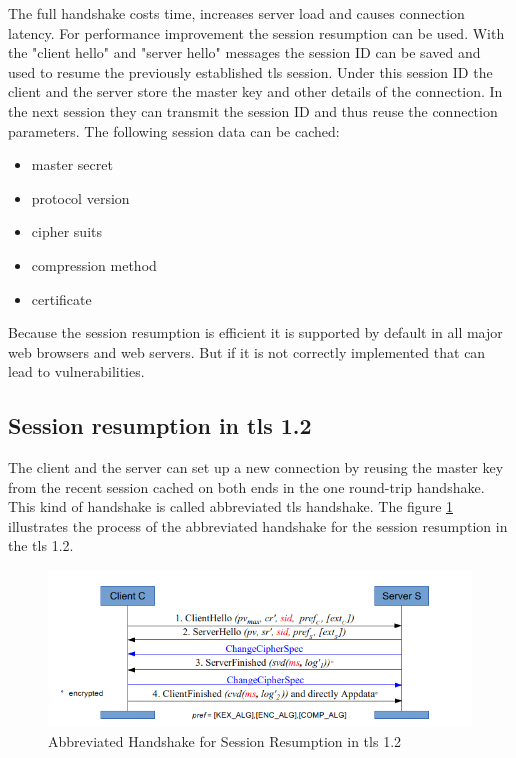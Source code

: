 The full handshake costs time, increases server load and causes connection latency. For performance improvement the session resumption can be used. With the "client hello" and "server hello" messages the session ID can be saved and used to resume the previously established \gls{tls} session. Under this session ID the client and the server store the master key and other details of the connection. In the next session they can transmit the session ID and thus reuse the connection parameters. The following session data can be cached:
\begin{itemize}
\item master secret
\item protocol version
\item cipher suits
\item compression method
\item certificate
\end{itemize}
Because the session resumption is efficient it is supported by default in all major web browsers and web servers. But if it is not correctly implemented that can lead to vulnerabilities.

\subsection{Session resumption in \gls{tls} 1.2}
\label{subsec:resumption1_2}

The client and the server can set up a new connection by reusing the master key from the recent session cached on both ends in the one round-trip handshake. This kind of handshake is called abbreviated \gls{tls} handshake. The figure \ref{fig:resumption1_2} illustrates the process of the abbreviated handshake for the session resumption in the \gls{tls} 1.2.

\begin{figure}[H]
	\centering
		\includegraphics[scale=0.85]{images/resumption1_2.png}
	\caption{Abbreviated Handshake for Session Resumption in \gls{tls} 1.2 \cite{Hassenstein}}
	\label{fig:resumption1_2}
\end{figure}


